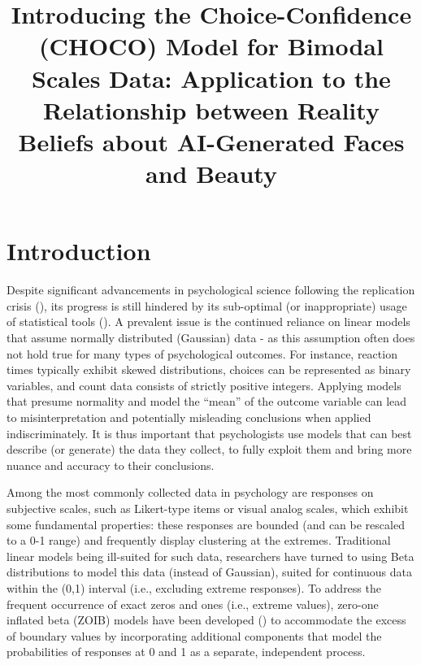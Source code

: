 \documentclass[
  jou,
  floatsintext,
  longtable,
  nolmodern,
  notxfonts,
  notimes,
  colorlinks=true,linkcolor=blue,citecolor=blue,urlcolor=blue]{apa7}
\title{\textbf{Introducing the Choice-Confidence (CHOCO) Model for
Bimodal Scales Data: Application to the Relationship between Reality
Beliefs about AI-Generated Faces and Beauty}}
\begin{document}
\maketitle


\setcounter{secnumdepth}{-\maxdimen} %

\setlength\LTleft{0pt}


\section{Introduction}\label{introduction}

Despite significant advancements in psychological science following the
replication crisis (), its progress is still hindered by its sub-optimal (or
inappropriate) usage of statistical tools
(). A prevalent
issue is the continued reliance on linear models that assume normally
distributed (Gaussian) data - as this assumption often does not hold
true for many types of psychological outcomes. For instance, reaction
times typically exhibit skewed distributions, choices can be represented
as binary variables, and count data consists of strictly positive
integers. Applying models that presume normality and model the ``mean''
of the outcome variable can lead to misinterpretation and potentially
misleading conclusions when applied indiscriminately. It is thus
important that psychologists use models that can best describe (or
generate) the data they collect, to fully exploit them and bring more
nuance and accuracy to their conclusions.

Among the most commonly collected data in psychology are responses on
subjective scales, such as Likert-type items or visual analog scales,
which exhibit some fundamental properties: these responses are bounded
(and can be rescaled to a 0-1 range) and frequently display clustering
at the extremes. Traditional linear models being ill-suited for such
data, researchers have turned to using Beta distributions to model this
data (instead of Gaussian), suited for continuous data within the (0,1)
interval (i.e., excluding extreme responses). To address the frequent
occurrence of exact zeros and ones (i.e., extreme values), zero-one
inflated beta (ZOIB) models have been developed
() to
accommodate the excess of boundary values by incorporating additional
components that model the probabilities of responses at 0 and 1 as a
separate, independent process.
\end{document}
